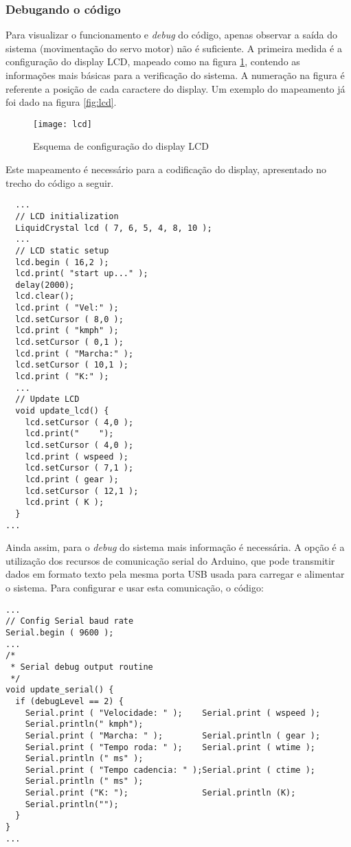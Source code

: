 \documentclass[a4paper,11pt]{article}
\begin{document}
\subsubsection{Debugando o código}

Para visualizar o funcionamento e \textit{debug} do código, apenas observar a
saída do sistema (movimentação do servo motor) não é suficiente. A primeira
medida é a configuração do display LCD, mapeado como na figura
\ref{fig:schemalcd}, contendo as informações mais básicas para a verificação do
sistema. A numeração na figura é referente a posição de cada caractere do
display. Um exemplo do mapeamento já foi dado na figura \ref{fig:lcd}.

\begin{figure}[h!]
\begin{center}
  \texttt{[image: lcd]}
\end{center}
  \caption{Esquema de configuração do display LCD}
  \label{fig:schemalcd}
\end{figure}

Este mapeamento é necessário para a codificação do display, apresentado no
trecho do código a seguir.
\begin{lstlisting}
  ...
  // LCD initialization
  LiquidCrystal lcd ( 7, 6, 5, 4, 8, 10 );
  ...
  // LCD static setup
  lcd.begin ( 16,2 );
  lcd.print( "start up..." );
  delay(2000);
  lcd.clear();
  lcd.print ( "Vel:" );
  lcd.setCursor ( 8,0 );
  lcd.print ( "kmph" );
  lcd.setCursor ( 0,1 );
  lcd.print ( "Marcha:" );
  lcd.setCursor ( 10,1 );
  lcd.print ( "K:" );
  ...
  // Update LCD
  void update_lcd() {
    lcd.setCursor ( 4,0 );
    lcd.print("    ");
    lcd.setCursor ( 4,0 );
    lcd.print ( wspeed );
    lcd.setCursor ( 7,1 );
    lcd.print ( gear );
    lcd.setCursor ( 12,1 );
    lcd.print ( K );
  }
...
\end{lstlisting}

Ainda assim, para o \textit{debug} do sistema mais informação é necessária. A
opção é a utilização dos recursos de comunicação serial do Arduino, que pode
transmitir dados em formato texto pela mesma porta USB usada para carregar e
alimentar o sistema. Para configurar e usar esta comunicação, o código:

\begin{lstlisting}
...
// Config Serial baud rate
Serial.begin ( 9600 );
...
/*
 * Serial debug output routine
 */
void update_serial() {
  if (debugLevel == 2) {
    Serial.print ( "Velocidade: " );    Serial.print ( wspeed );
    Serial.println(" kmph");
    Serial.print ( "Marcha: " );        Serial.println ( gear );
    Serial.print ( "Tempo roda: " );    Serial.print ( wtime );
    Serial.println (" ms" );
    Serial.print ( "Tempo cadencia: " );Serial.print ( ctime );
    Serial.println (" ms" );
    Serial.print ("K: ");               Serial.println (K);
    Serial.println("");
  }
}
...
\end{lstlisting}
\end{document}
